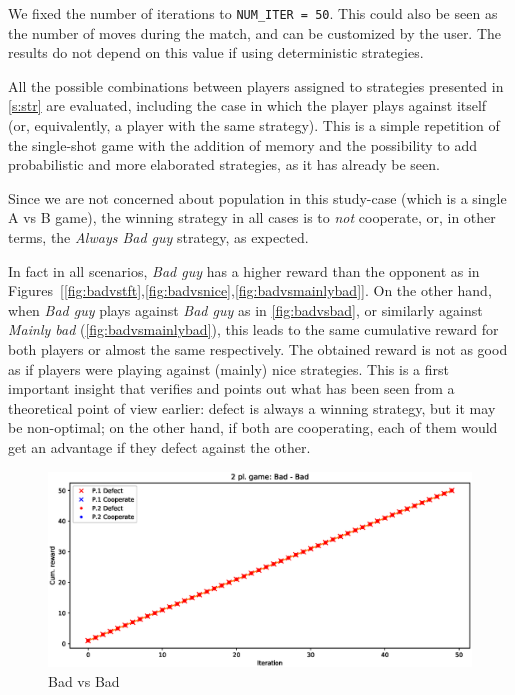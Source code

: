 \documentclass[journal,a4paper,10pt,twoside]{IEEEtran} %
\begin{document}
We fixed the number of iterations to \texttt{NUM\_ITER = 50}. This could also be seen as the number of moves during the match, and can be customized by the user. The results do not depend on this value if using deterministic strategies.

All the possible combinations between players assigned to strategies presented in \autoref{s:str} are evaluated, including the case in which the player plays against itself (or, equivalently, a player with the same strategy).
This is a simple repetition of the single-shot game with the addition of memory and the possibility to add probabilistic and more elaborated strategies, as it has already be seen.

Since we are not concerned about population in this study-case (which is a single A vs B game), the winning strategy in all cases is to \textit{not} cooperate, or, in other terms, the \textit{Always Bad guy} strategy, as expected.

In fact in all scenarios, \textit{Bad guy} has a higher reward than the opponent as in Figures~[\ref{fig:badvstft},\ref{fig:badvsnice},\ref{fig:badvsmainlybad}]. 
On the other hand, when \textit{Bad guy} plays against \textit{Bad guy} as in \autoref{fig:badvsbad}, or similarly against \textit{Mainly bad} (\autoref{fig:badvsmainlybad}), this leads to the same cumulative reward for both players or almost the same respectively. The obtained reward is not as good as if players were playing against (mainly) nice strategies. This is a first important insight that verifies and points out what has been seen from a theoretical point of view earlier: defect is always a winning strategy, but it may be non-optimal; on the other hand, if both are cooperating, each of them would get an advantage if they defect against the other.

\begin{figure}[!ht]
    \centering
    \includegraphics[width=1\columnwidth]{../img/ipd2p/ipd2p-rewards-Bad-Bad}
    \caption{Bad vs Bad}
    \label{fig:badvsbad}
\end{figure}
\end{document}

